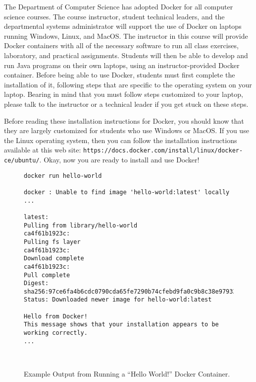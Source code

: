 \documentclass[11pt]{article}
\newcommand{\url}[1]{\lstinline{#1}}
\begin{document}
The Department of Computer Science has adopted Docker for all computer science
courses. The course instructor, student technical leaders, and the departmental
systems administrator will support the use of Docker on laptops running Windows,
Linux, and MacOS. The instructor in this course will provide Docker containers
with all of the necessary software to run all class exercises, laboratory, and
practical assignments. Students will then be able to develop and run Java
programs on their own laptops, using an instructor-provided Docker container.
Before being able to use Docker, students must first complete the installation
of it, following steps that are specific to the operating system on your laptop.
Bearing in mind that you must follow steps customized to your laptop, please
talk to the instructor or a technical leader if you get stuck on these steps.

Before reading these installation instructions for Docker, you should know that
they are largely customized for students who use Windows or MacOS. If you use
the Linux operating system, then you can follow the installation instructions
available at this web site:
\url{https://docs.docker.com/install/linux/docker-ce/ubuntu/}. Okay, now you are
ready to install and use Docker!

\begin{figure}

\begin{verbatim}
docker run hello-world

docker : Unable to find image 'hello-world:latest' locally
...

latest:
Pulling from library/hello-world
ca4f61b1923c:
Pulling fs layer
ca4f61b1923c:
Download complete
ca4f61b1923c:
Pull complete
Digest: sha256:97ce6fa4b6cdc0790cda65fe7290b74cfebd9fa0c9b8c38e979330d547d22ce1
Status: Downloaded newer image for hello-world:latest

Hello from Docker!
This message shows that your installation appears to be working correctly.
...
\end{verbatim}

\vspace*{-.25in}
\caption{Example Output from Running a ``Hello World!''  Docker Container.}~\label{fig:docker}
\vspace*{-.25in}
\end{figure}
\end{document}
